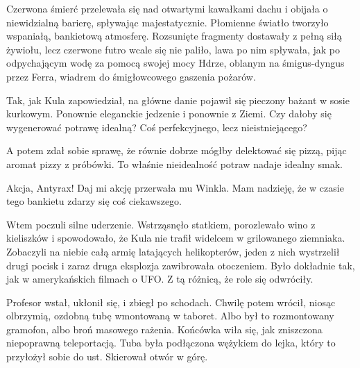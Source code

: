 Czerwona śmierć przelewała się nad otwartymi kawałkami dachu i obijała o niewidzialną barierę, spływając majestatycznie.
Płomienne światło tworzyło wspaniałą, bankietową atmosferę.
Rozsunięte fragmenty dostawały z pełną siłą żywiołu, lecz czerwone futro wcale się nie paliło, lawa po nim spływała, 
jak po odpychającym wodę za pomocą swojej mocy Hdrze, oblanym na śmigus-dyngus przez Ferra, wiadrem do śmigłowcowego gaszenia pożarów.

Tak, jak Kula zapowiedział, na główne danie pojawił się pieczony bażant w sosie kurkowym.
Ponownie eleganckie jedzenie i ponownie z Ziemi. 
Czy dałoby się wygenerować potrawę idealną? 
Coś perfekcyjnego, lecz nieistniejącego?

A potem zdał sobie sprawę, że równie dobrze mógłby delektować się pizzą, pijąc aromat pizzy z próbówki.
To właśnie nieidealność potraw nadaje idealny smak.

\divider{} 

\begin{dialogue}
\ds{} Akcja, Antyrax! Daj mi akcję \dm{} przerwała mu Winkla. \dm{} Mam nadzieję, że w czasie tego bankietu zdarzy się coś ciekawszego.
\end{dialogue}

\divider{}

Wtem poczuli silne uderzenie. Wstrząsnęło statkiem, porozlewało wino z kieliszków i spowodowało, że Kula nie trafił widelcem w grilowanego ziemniaka.
Zobaczyli na niebie całą armię latających helikopterów, jeden z nich wystrzelił drugi pocisk i zaraz druga eksplozja zawibrowała otoczeniem.
Było dokładnie tak, jak w amerykańskich filmach o UFO. Z tą różnicą, że role się odwróciły.

Profesor wstał, ukłonił się, i zbiegł po schodach. Chwilę potem wrócił, niosąc olbrzymią, ozdobną tubę wmontowaną w taboret. 
Albo był to rozmontowany gramofon, albo broń masowego rażenia. Końcówka wiła się, jak zniszczona niepoprawną teleportacją.
Tuba była podłączona wężykiem do lejka, który to przyłożył sobie do ust.
Skierował otwór w górę.

